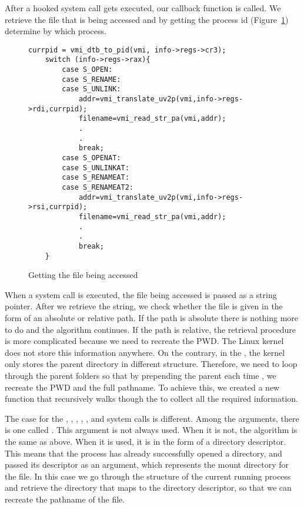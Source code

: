 After a hooked system call gets executed, our callback function is called. We retrieve the file that is being accessed and by getting the  process id (Figure~\ref{fig:getfile}) determine by which process. 

\begin{figure}[ht]
\selectfont
\begin{lstlisting}[style=CStyle]
	currpid = vmi_dtb_to_pid(vmi, info->regs->cr3);
	switch (info->regs->rax){
		case S_OPEN:
		case S_RENAME:
		case S_UNLINK:
			addr=vmi_translate_uv2p(vmi,info->regs->rdi,currpid);
			filename=vmi_read_str_pa(vmi,addr);
			.
			.
			break;
		case S_OPENAT:
		case S_UNLINKAT:
		case S_RENAMEAT:
		case S_RENAMEAT2:
			addr=vmi_translate_uv2p(vmi,info->regs->rsi,currpid);
			filename=vmi_read_str_pa(vmi,addr);
			.
			.
			break;	
	}
\end{lstlisting}
	\caption{Getting the file being accessed}
	\label{fig:getfile}
\end{figure}


\par When a system call is executed, the file being accessed is passed as a string pointer. After we retrieve the string, we check whether the file is given in the form of an absolute or relative path. If the path is absolute there is nothing more to do and the algorithm continues. If the path is relative, the retrieval procedure is more complicated because we need to recreate the \ac{PWD}. The Linux kernel does not store this information anywhere. On the contrary, in the , the kernel only stores the parent directory in different structure. Therefore, we need to loop through the parent folders so that by prepending the parent each time , we recreate the \ac{PWD} and the full pathname. To achieve this, we created a new function that recursively walks though the  to collect all the required information. 

\par The case for the , , , , , and  system calls is different. Among the arguments, there is one called . This argument is not always used. When it is not, the algorithm is the same as above. When it is used, it is in the form of a directory descriptor. This means that the process has already successfully opened a directory, and passed its descriptor as an argument, which represents the mount directory for the file. In this case we go through the  structure of the current running process and retrieve the directory that maps to the directory descriptor, so that we can recreate the pathname of the file.

